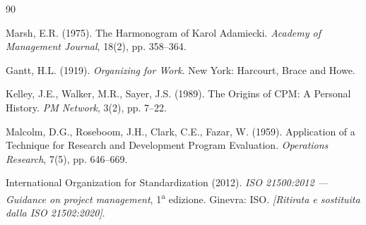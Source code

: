 \begin{thebibliography}{90}
\rhead[\fancyplain{}{\bfseries \leftmark}]{\fancyplain{}{\bfseries
\thepage}}

%
%
%
%


 Marsh, E.R. (1975). The Harmonogram of Karol Adamiecki.
  \emph{Academy of Management Journal}, 18(2), pp. 358--364.

 Gantt, H.L. (1919). \emph{Organizing for Work}. New York:
  Harcourt, Brace and Howe.

 Kelley, J.E., Walker, M.R., Sayer, J.S. (1989). The Origins
  of CPM: A Personal History. \emph{PM Network}, 3(2), pp. 7--22.

 Malcolm, D.G., Roseboom, J.H., Clark, C.E., Fazar, W.
  (1959). Application of a Technique for Research and Development Program
  Evaluation. \emph{Operations Research}, 7(5), pp. 646--669.

 International Organization for Standardization (2012).
  \emph{ISO 21500:2012 --- Guidance on project management}, 1\textsuperscript{a}
  edizione. Ginevra: ISO. \emph{[Ritirata e sostituita dalla ISO 21502:2020]}.


\end{thebibliography}
